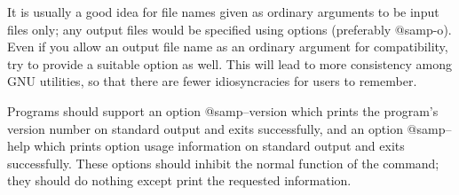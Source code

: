 It is usually a good idea for file names given as ordinary arguments
to be input files only; any output files would be specified using
options (preferably @samp{-o}).  Even if you allow an output file name
as an ordinary argument for compatibility, try to provide a suitable
option as well.  This will lead to more consistency among GNU
utilities, so that there are fewer idiosyncracies for users to
remember.

Programs should support an option @samp{--version} which prints the
program's version number on standard output and exits successfully, and
an option @samp{--help} which prints option usage information on
standard output and exits successfully.  These options should inhibit
the normal function of the command; they should do nothing except print
the requested information.


